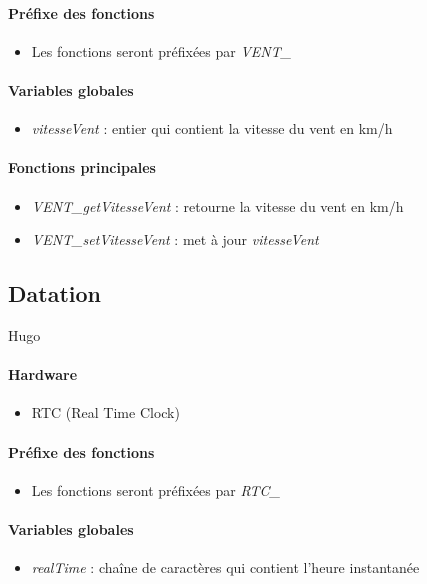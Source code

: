 \documentclass[a4paper]{report}
\begin{document}
\paragraph{Préfixe des fonctions}
\begin{itemize}
\item Les fonctions seront préfixées par \emph{VENT\_}
\end{itemize}
\paragraph{Variables globales}
\begin{itemize}
\item \emph{vitesseVent} : entier qui contient la vitesse du vent en km/h
\end{itemize}
\paragraph{Fonctions principales}
\begin{itemize}
\item \emph{VENT\_getVitesseVent} : retourne la vitesse du vent en km/h
\item \emph{VENT\_setVitesseVent} : met à jour \emph{vitesseVent}
\end{itemize}

\subsection{Datation}
Hugo 
\paragraph{Hardware}
\begin{itemize}
\item RTC (Real Time Clock)
\end{itemize}
\paragraph{Préfixe des fonctions}
\begin{itemize}
\item Les fonctions seront préfixées par \emph{RTC\_}
\end{itemize}
\paragraph{Variables globales}
\begin{itemize}
\item \emph{realTime} : chaîne de caractères qui contient l’heure instantanée
\end{itemize}
\end{document}
